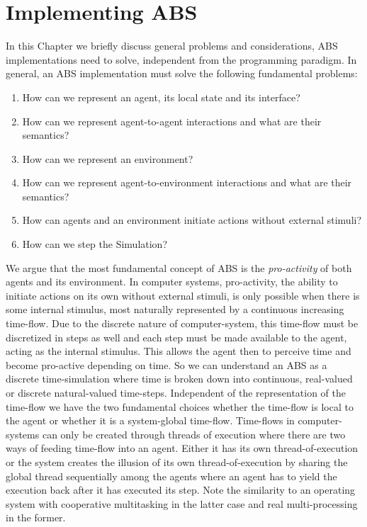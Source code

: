 \chapter{Implementing ABS}
\label{ch:impl_abs}

In this Chapter we briefly discuss general problems and considerations, ABS implementations need to solve, independent from the programming paradigm. In general, an ABS implementation must solve the following fundamental problems:

\begin{enumerate}
	\item How can we represent an agent, its local state and its interface?
	\item How can we represent agent-to-agent interactions and what are their semantics?
	\item How can we represent an environment?
	\item How can we represent agent-to-environment interactions and what are their semantics?
	\item How can agents and an environment initiate actions without external stimuli?
	\item How can we step the Simulation?
\end{enumerate}

We argue that the most fundamental concept of ABS is the \textit{pro-activity} of both agents and its environment. In computer systems, pro-activity, the ability to initiate actions on its own without external stimuli, is only possible when there is some internal stimulus, most naturally represented by a continuous increasing time-flow. Due to the discrete nature of computer-system, this time-flow must be discretized in steps as well and each step must be made available to the agent, acting as the internal stimulus. This allows the agent then to perceive time and become pro-active depending on time. So we can understand an ABS as a discrete time-simulation where time is broken down into continuous, real-valued or discrete natural-valued time-steps. Independent of the representation of the time-flow we have the two fundamental choices whether the time-flow is local to the agent or whether it is a system-global time-flow. Time-flows in computer-systems can only be created through threads of execution where there are two ways of feeding time-flow into an agent. Either it has its own thread-of-execution or the system creates the illusion of its own thread-of-execution by sharing the global thread sequentially among the agents where an agent has to yield the execution back after it has executed its step. Note the similarity to an operating system with cooperative multitasking in the latter case and real multi-processing in the former.


